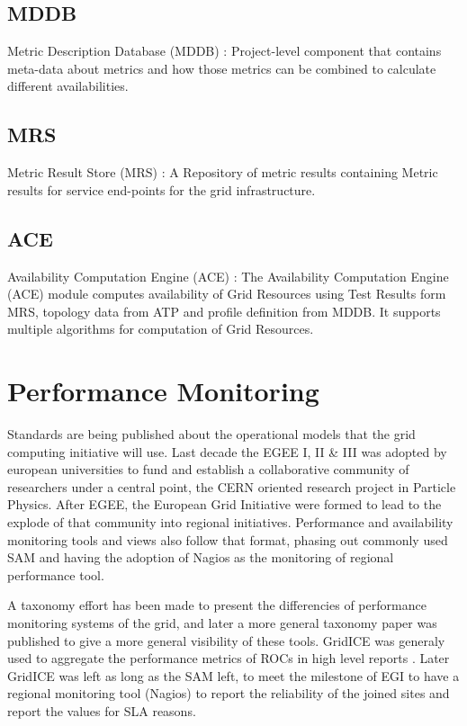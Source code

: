 \subsection{MDDB}
Metric Description Database (MDDB) : Project-level component that contains
meta-data about metrics and how those metrics can be combined to calculate
different availabilities.

\subsection{MRS}
Metric Result Store (MRS) : A Repository of metric results containing Metric
results for service end-points for the grid infrastructure.

\subsection{ACE}
Availability Computation Engine (ACE) : The Availability Computation Engine
(ACE) module computes availability of Grid Resources using Test Results form
MRS, topology data from ATP and profile definition from MDDB. It supports
multiple algorithms for computation of Grid Resources.



\section{Performance Monitoring}
Standards are being published about the operational models that the grid
computing initiative will use. Last decade the EGEE I, II \& III was adopted by
european universities to fund and establish a collaborative community of
researchers under a central point, the CERN oriented research project in
Particle Physics. After EGEE, the European Grid Initiative were formed to lead
to the explode of that community into regional initiatives. Performance
and availability monitoring tools and views also follow that format, phasing out
commonly used SAM \cite{egee3dsa122} and having the adoption of Nagios as the
monitoring of regional performance tool.


A taxonomy effort has been made \cite{gerndt2004performance} to present the
differencies of performance monitoring systems of the grid, and later a more
general \cite{zanikolas2007importance} taxonomy paper was published to give a
more general visibility of these tools. GridICE was generaly used to aggregate
the performance metrics of ROCs in high level reports
\cite{andreozzi2005gridice}. Later GridICE was left as long as the SAM left, to
meet the milestone of EGI to have a regional monitoring tool (Nagios) to report
the reliability of the joined sites and report the values for SLA reasons.

